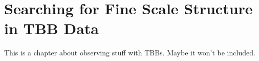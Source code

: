 \doublespacing
\chapter{Searching for Fine Scale Structure in TBB Data}
\label{chap:tbb}
This is a chapter about observing stuff with TBBs. Maybe it won't be included.